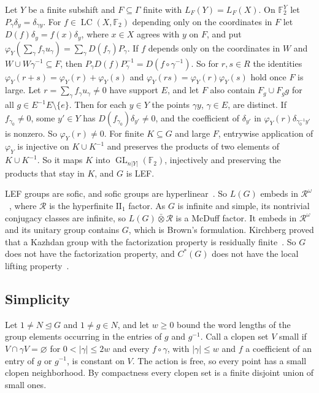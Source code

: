 \documentclass[11pt]{amsart}
\newcommand{\F}{\mathbb F}
\newcommand{\LC}{\operatorname{LC}}
\newcommand{\GL}{\operatorname{GL}}
\begin{document}
Let $Y$ be a finite subshift and $F\subseteq\Gamma$ finite with
$L_F(Y)=L_F(X)$. On $\F_2^Y$ let $P_\gamma\delta_y=\delta_{\gamma y}$. For
$f\in\LC(X,\F_2)$ depending only on the coordinates in $F$ let
$D(f)\delta_y=f(x)\delta_y$, where $x\in X$ agrees with $y$ on $F$, and put
$\varphi_Y(\sum_\gamma f_\gamma u_\gamma)=\sum_\gamma D(f_\gamma)P_\gamma$.
If $f$ depends only on the coordinates in $W$ and
$W\cup W\gamma^{-1}\subseteq F$, then $P_\gamma D(f)P_\gamma^{-1}=D(f\circ\gamma^{-1})$.
So for $r,s\in R$ the identities $\varphi_Y(r+s)=\varphi_Y(r)+\varphi_Y(s)$
and $\varphi_Y(rs)=\varphi_Y(r)\varphi_Y(s)$ hold once $F$ is large. Let
$r=\sum_\gamma f_\gamma u_\gamma\ne0$ have support $E$, and let $F$ also
contain $F_g\cup F_gg$ for all $g\in E^{-1}E\setminus\{e\}$. Then for each
$y\in Y$ the points $\gamma y$, $\gamma\in E$, are distinct. If
$f_{\gamma_0}\ne0$, some $y'\in Y$ has $D(f_{\gamma_0})\delta_{y'}\ne0$, and
the coefficient of $\delta_{y'}$ in $\varphi_Y(r)\delta_{\gamma_0^{-1}y'}$
is nonzero. So $\varphi_Y(r)\ne0$. For finite $K\subseteq G$ and large $F$,
entrywise application of $\varphi_Y$ is injective on $K\cup K^{-1}$ and
preserves the products of two elements of $K\cup K^{-1}$. So it maps $K$
into $\GL_{n|Y|}(\F_2)$, injectively and preserving the products that
stay in $K$, and $G$ is LEF.

LEF groups are sofic, and sofic groups are
hyperlinear~\cite[Example~4.5 and Theorem~3.3]{Pestov}. So $L(G)$ embeds
in $\mathcal R^\omega$~\cite[Proposition~7.1]{Ozawa}, where $\mathcal R$ is
the hyperfinite $\mathrm{II}_1$ factor. As $G$ is infinite and simple,
its nontrivial conjugacy classes are infinite, so
$L(G)\mathbin{\bar\otimes}\mathcal R$ is a McDuff factor. It embeds in
$\mathcal R^\omega$ and its unitary group contains $G$, which is Brown's
formulation. Kirchberg proved that a Kazhdan group
with the factorization property is residually
finite~\cite[Theorem~1.1]{Kirchberg}. So $G$ does not have the
factorization property, and $C^*(G)$ does not have the local lifting
property~\cite[p.~527]{Ozawa}.

\subsection*{Simplicity}
Let $1\ne N\trianglelefteq G$ and $1\ne g\in N$, and let $w\ge0$ bound the
word lengths of the group elements occurring in the entries of $g$ and
$g^{-1}$. Call a clopen set $V$ small if $V\cap\gamma V=\varnothing$ for
$0<|\gamma|\le2w$ and every $f\circ\gamma$, with $|\gamma|\le w$ and $f$ a
coefficient of an entry of $g$ or $g^{-1}$, is constant on $V$. The
action is free, so every point has a small clopen neighborhood. By
compactness every clopen set is a finite disjoint union of small ones.
\end{document}
